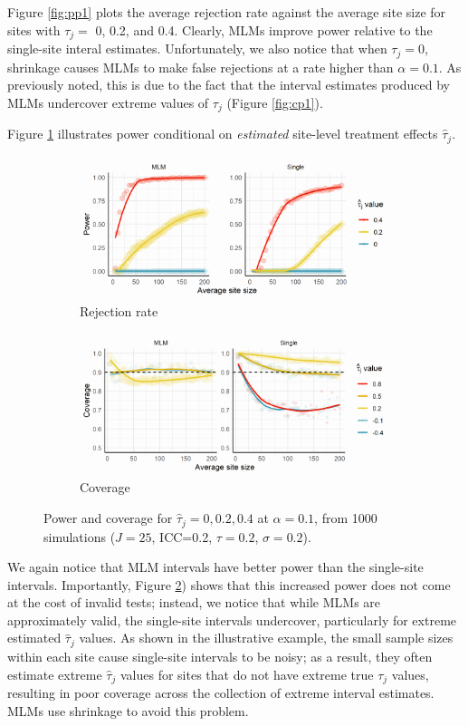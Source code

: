 \documentclass[]{article}
\begin{document}
Figure \ref{fig:pp1} plots the average rejection rate against the average site size for sites with $\tau_j =$ 0, 0.2, and 0.4.
Clearly, MLMs improve power relative to the single-site interal estimates.
Unfortunately, we also notice that when $\tau_j = 0$, shrinkage causes MLMs to make false rejections at a rate higher than $\alpha=0.1$.
As previously noted, this is due to the fact that the interval estimates produced by MLMs undercover extreme values of $\tau_j$ (Figure \ref{fig:cp1}).

Figure \ref{fig:pp2} illustrates power conditional on \textit{estimated} site-level treatment effects $\hat{\tau}_j$.
\begin{figure}[ht]
    \centering
    \begin{subfigure}[a]{\textwidth}
    	\includegraphics[width=\textwidth]{pp2}
        \caption{Rejection rate}
    	\label{fig:pp2}
    \end{subfigure}
    \vfill
    \begin{subfigure}[b]{\textwidth}
    	\includegraphics[width=\textwidth]{cp2}
        \caption{Coverage}
    	\label{fig:cp2}
    \end{subfigure}
    \caption{Power and coverage for $\hat{\tau}_j = 0, 0.2, 0.4$ at $\alpha=0.1$, from 1000 simulations ($J=25$, ICC=0.2, $\tau=0.2$, $\sigma=0.2$).}
    \label{fig:pcp2}
\end{figure}
We again notice that MLM intervals have better power than the single-site intervals.
Importantly, Figure \ref{fig:cp2}) shows that this increased power does not come at the cost of invalid tests; instead, we notice that while MLMs are approximately valid, the single-site intervals undercover, particularly for extreme estimated $\hat{\tau}_j$ values.
As shown in the illustrative example, the small sample sizes within each site cause single-site intervals to be noisy; as a result, they often estimate extreme $\hat{\tau}_j$ values for sites that do not have extreme true $\tau_j$ values, resulting in poor coverage across the collection of extreme interval estimates.
MLMs use shrinkage to avoid this problem.
\end{document}
